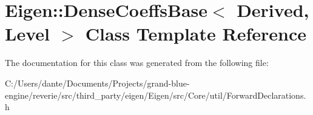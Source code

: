 \hypertarget{class_eigen_1_1_dense_coeffs_base}{}\section{Eigen\+::Dense\+Coeffs\+Base$<$ Derived, Level $>$ Class Template Reference}
\label{class_eigen_1_1_dense_coeffs_base}


The documentation for this class was generated from the following file\+:\begin{DoxyCompactItemize}
\item 
C\+:/\+Users/dante/\+Documents/\+Projects/grand-\/blue-\/engine/reverie/src/third\+\_\+party/eigen/\+Eigen/src/\+Core/util/Forward\+Declarations.\+h\end{DoxyCompactItemize}
